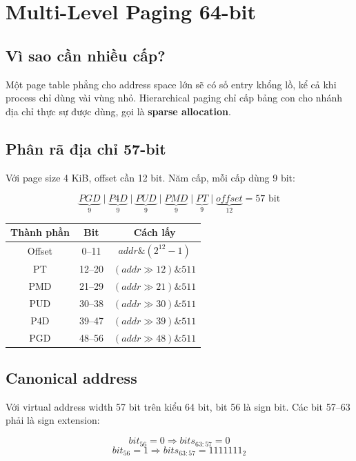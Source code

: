 \documentclass[12pt,a4paper]{article}
\newcommand{\term}[1]{\textbf{\color{bkblue}#1}}
\begin{document}
\section{Multi-Level Paging 64-bit}

\subsection{Vì sao cần nhiều cấp?}

Một page table phẳng cho address space lớn sẽ có số entry khổng lồ, kể cả khi
process chỉ dùng vài vùng nhỏ. Hierarchical paging chỉ cấp bảng con cho nhánh
địa chỉ thực sự được dùng, gọi là \term{sparse allocation}.

\subsection{Phân rã địa chỉ 57-bit}

Với page size 4 KiB, offset cần 12 bit. Năm cấp, mỗi cấp dùng 9 bit:

\[
\underbrace{PGD}_{9}
\mid\underbrace{P4D}_{9}
\mid\underbrace{PUD}_{9}
\mid\underbrace{PMD}_{9}
\mid\underbrace{PT}_{9}
\mid\underbrace{offset}_{12}
=57\text{ bit}
\]

\begin{longtable}{|c|c|c|}
\hline
\textbf{Thành phần} & \textbf{Bit} & \textbf{Cách lấy}\\ \hline
Offset & 0--11 & \(addr \mathbin{\&} (2^{12}-1)\)\\ \hline
PT & 12--20 & \((addr \gg 12) \mathbin{\&} 511\)\\ \hline
PMD & 21--29 & \((addr \gg 21) \mathbin{\&} 511\)\\ \hline
PUD & 30--38 & \((addr \gg 30) \mathbin{\&} 511\)\\ \hline
P4D & 39--47 & \((addr \gg 39) \mathbin{\&} 511\)\\ \hline
PGD & 48--56 & \((addr \gg 48) \mathbin{\&} 511\)\\ \hline
\end{longtable}

\subsection{Canonical address}

Với virtual address width 57 bit trên kiểu 64 bit, bit 56 là sign bit. Các
bit 57--63 phải là sign extension:

\[
bit_{56}=0 \Rightarrow bits_{63:57}=0
\]
\[
bit_{56}=1 \Rightarrow bits_{63:57}=1111111_2
\]
\end{document}
